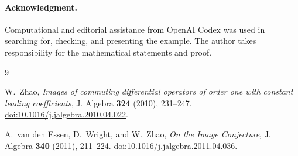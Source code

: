 \documentclass[11pt]{article}
\begin{document}
\paragraph{Acknowledgment.}
Computational and editorial assistance from OpenAI Codex was used in
searching for, checking, and presenting the example.  The author takes
responsibility for the mathematical statements and proof.

\begin{thebibliography}{9}
\small

W.~Zhao,
\emph{Images of commuting differential operators of order one with
constant leading coefficients},
J. Algebra \textbf{324} (2010), 231--247.
\href{https://doi.org/10.1016/j.jalgebra.2010.04.022}
{doi:10.1016/j.jalgebra.2010.04.022}.

A.~van den Essen, D.~Wright, and W.~Zhao,
\emph{On the Image Conjecture},
J. Algebra \textbf{340} (2011), 211--224.
\href{https://doi.org/10.1016/j.jalgebra.2011.04.036}
{doi:10.1016/j.jalgebra.2011.04.036}.

\end{thebibliography}
\end{document}
